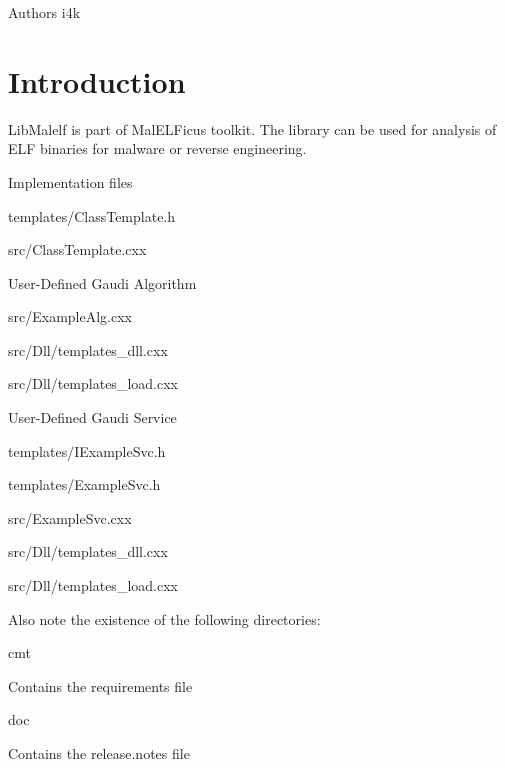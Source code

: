\begin{DoxyAuthor}{Authors}
i4k
\end{DoxyAuthor}
\hypertarget{index_Introduction}{}\section{Introduction}\label{index_Introduction}
LibMalelf is part of MalELFicus toolkit. The library can be used for analysis of ELF binaries for malware or reverse engineering.


\begin{DoxyItemize}
\item Implementation files
\end{DoxyItemize}
\begin{DoxyEnumerate}
\item templates/ClassTemplate.h
\item src/ClassTemplate.cxx
\end{DoxyEnumerate}
\begin{DoxyItemize}
\item User-\/Defined Gaudi Algorithm
\end{DoxyItemize}
\begin{DoxyEnumerate}
\item src/ExampleAlg.cxx
\item src/Dll/templates\_\-dll.cxx
\item src/Dll/templates\_\-load.cxx
\end{DoxyEnumerate}
\begin{DoxyItemize}
\item User-\/Defined Gaudi Service
\end{DoxyItemize}
\begin{DoxyEnumerate}
\item templates/IExampleSvc.h
\item templates/ExampleSvc.h
\item src/ExampleSvc.cxx
\item src/Dll/templates\_\-dll.cxx
\item src/Dll/templates\_\-load.cxx
\end{DoxyEnumerate}

Also note the existence of the following directories:
\begin{DoxyItemize}
\item cmt
\end{DoxyItemize}
\begin{DoxyEnumerate}
\item Contains the requirements file
\end{DoxyEnumerate}
\begin{DoxyItemize}
\item doc
\end{DoxyItemize}
\begin{DoxyEnumerate}
\item Contains the release.notes file
\end{DoxyEnumerate}

